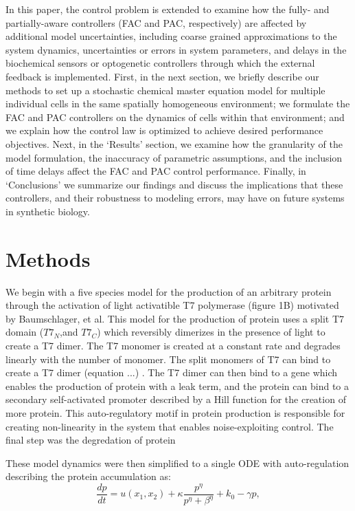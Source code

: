 \documentclass[12pt]{article}
\begin{document}
In this paper, the control problem is extended to examine how the fully- and partially-aware controllers (FAC and PAC, respectively) are affected by additional model uncertainties, including coarse grained approximations to the system dynamics, uncertainties or errors in system parameters, and delays in the biochemical sensors or optogenetic controllers through which the external feedback is implemented. First, in the next section, we briefly describe our methods to set up a stochastic chemical master equation model for multiple individual cells in the same spatially homogeneous environment; we formulate the FAC and PAC controllers on the dynamics of cells within that environment; and we explain how the control law is optimized to achieve desired performance objectives. Next, in the `Results' section, we examine how the granularity of the model formulation, the inaccuracy of parametric assumptions, and the inclusion of time delays affect the FAC and PAC control performance. Finally, in `Conclusions' we summarize our findings and discuss the implications that these controllers, and their robustness to modeling errors, may have on future systems in synthetic biology.

\section{Methods}
We begin with a five species model for the production of an arbitrary protein through the activation of light activatible T7 polymerase (figure 1B) motivated by Baumschlager, et al.
This model for the production of protein uses a split T7 domain ($T7_N$,and $T7_C$) which reversibly dimerizes in the presence of light to create a T7 dimer. The T7 monomer is created at a constant rate and degrades linearly with the number of monomer. The split monomers of T7 can bind to create a T7 dimer (equation ...) . The T7 dimer can then bind to a gene which enables the production of protein with a leak term, and the protein can bind to a secondary self-activated promoter described by a Hill function for the creation of more protein. This auto-regulatory motif in protein production is responsible for creating non-linearity in the system that enables noise-exploiting control. The final step was the degredation of protein 

These model dynamics were then simplified to a single ODE with auto-regulation describing the protein accumulation as: 
\begin{equation}
\frac{dp}{dt}=u(x_1,x_2)  + \kappa\frac{p^\eta}{p^\eta+\beta^\eta}+ k_0 -\gamma p,
\label{rateeq}
\end{equation}
\end{document}
